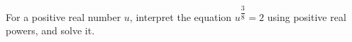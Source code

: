 For a positive real number $u$, interpret the equation $u^{\dfrac{3}{8}}=2$ using positive real powers, and solve it.
